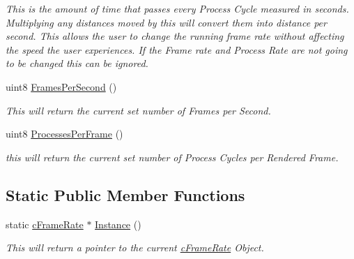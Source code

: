 \begin{DoxyCompactItemize}
\begin{DoxyCompactList}\small\item\em This is the amount of time that passes every Process Cycle measured in seconds. Multiplying any distances moved by this will convert them into distance per second. This allows the user to change the running frame rate without affecting the speed the user experiences. If the Frame rate and Process Rate are not going to be changed this can be ignored. \end{DoxyCompactList}\item 
\hypertarget{classc_frame_rate_ab450d4c204172469695433474227bd19}{
uint8 \hyperlink{classc_frame_rate_ab450d4c204172469695433474227bd19}{FramesPerSecond} ()}
\label{classc_frame_rate_ab450d4c204172469695433474227bd19}

\begin{DoxyCompactList}\small\item\em This will return the current set number of Frames per Second. \end{DoxyCompactList}\item 
\hypertarget{classc_frame_rate_ab1b0bc7a9801cbea5d8036203a0a9ee4}{
uint8 \hyperlink{classc_frame_rate_ab1b0bc7a9801cbea5d8036203a0a9ee4}{ProcessesPerFrame} ()}
\label{classc_frame_rate_ab1b0bc7a9801cbea5d8036203a0a9ee4}

\begin{DoxyCompactList}\small\item\em this will return the current set number of Process Cycles per Rendered Frame. \end{DoxyCompactList}\end{DoxyCompactItemize}
\subsection*{Static Public Member Functions}
\begin{DoxyCompactItemize}
\item 
\hypertarget{classc_frame_rate_a3627aa44ddb1118494ab781a351abb74}{
static \hyperlink{classc_frame_rate}{cFrameRate} $\ast$ \hyperlink{classc_frame_rate_a3627aa44ddb1118494ab781a351abb74}{Instance} ()}
\label{classc_frame_rate_a3627aa44ddb1118494ab781a351abb74}

\begin{DoxyCompactList}\small\item\em This will return a pointer to the current \hyperlink{classc_frame_rate}{cFrameRate} Object. \end{DoxyCompactList}\end{DoxyCompactItemize}


